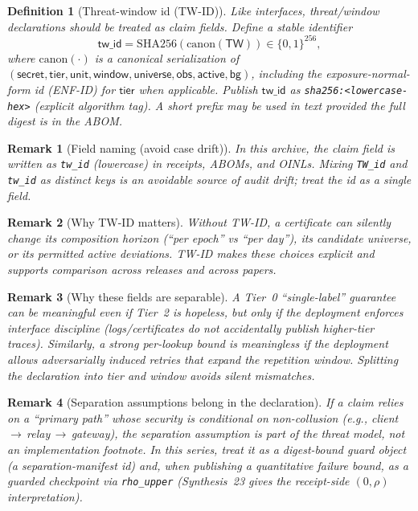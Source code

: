 \documentclass[11pt]{article}
\newtheorem{definition}{Definition}
\newtheorem{remark}{Remark}
\begin{document}
\begin{definition}[Threat-window id (TW-ID)]
Like interfaces, threat/window declarations should be treated as claim fields.
Define a stable identifier
\[
\mathsf{tw\_id}=\mathrm{SHA256}(\mathrm{canon}(\mathsf{TW}))\in\{0,1\}^{256},
\]
where $\mathrm{canon}(\cdot)$ is a canonical serialization of
$(\mathsf{secret},\mathsf{tier},\mathsf{unit},\mathsf{window},\mathsf{universe},\mathsf{obs},\mathsf{active},\mathsf{bg})$,
including the exposure-normal-form id (ENF-ID) for $\mathsf{tier}$ when applicable.
Publish $\mathsf{tw\_id}$ as \texttt{sha256:<lowercase-hex>} (explicit algorithm tag). A short prefix may be used in text provided the full digest is in the ABOM.
\end{definition}

\begin{remark}[Field naming (avoid case drift)]
In this archive, the claim field is written as \texttt{tw\_id} (lowercase) in receipts, ABOMs, and OINLs.
Mixing \texttt{TW\_id} and \texttt{tw\_id} as distinct keys is an avoidable source of audit drift; treat the id as a single field.
\end{remark}

\begin{remark}[Why TW-ID matters]
Without TW-ID, a certificate can silently change its composition horizon (``per epoch'' vs ``per day''), its candidate universe, or its permitted active deviations.
TW-ID makes these choices explicit and supports comparison across releases and across papers.
\end{remark}

\begin{remark}[Why these fields are separable]
A Tier~0 ``single-label'' guarantee can be meaningful even if Tier~2 is hopeless, but only if the deployment enforces interface discipline (logs/certificates do not accidentally publish higher-tier traces).
Similarly, a strong per-lookup bound is meaningless if the deployment allows adversarially induced retries that expand the repetition window.
Splitting the declaration into \emph{tier} and \emph{window} avoids silent mismatches.
\end{remark}

\begin{remark}[Separation assumptions belong in the declaration]
If a claim relies on a ``primary path'' whose security is conditional on non-collusion (e.g., client\,$\to$\,relay\,$\to$\,gateway), the separation assumption is part of the threat model, not an implementation footnote.
In this series, treat it as a digest-bound guard object (a separation-manifest id) and, when publishing a quantitative failure bound, as a guarded checkpoint via \texttt{rho\_upper} (Synthesis~23 gives the receipt-side $(0,\rho)$ interpretation). \cite{series:primarysepmanifest,series:probsep}
\end{remark}
\end{document}
